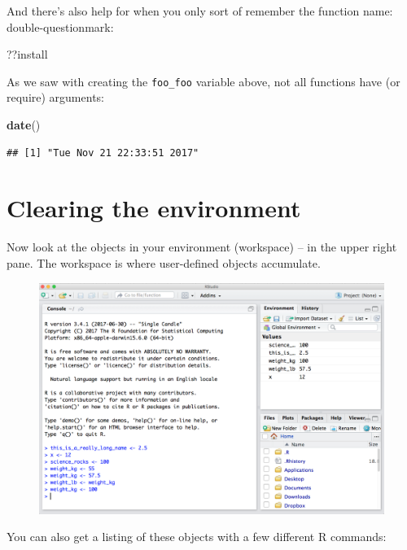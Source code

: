 \documentclass[]{book}
\newenvironment{Shaded}{\begin{snugshade}}{\end{snugshade}}
\newcommand{\KeywordTok}[1]{\textcolor[rgb]{0.13,0.29,0.53}{\textbf{#1}}}
\newcommand{\NormalTok}[1]{#1}
\theoremstyle{definition}
\theoremstyle{definition}
\theoremstyle{definition}
\theoremstyle{remark}
\begin{document}
And there's also help for when you only sort of remember the function
name: double-questionmark:

\begin{Shaded}
\begin{Highlighting}[]
\NormalTok{??install }
\end{Highlighting}
\end{Shaded}

As we saw with creating the \texttt{foo\_foo} variable above, not all
functions have (or require) arguments:

\begin{Shaded}
\begin{Highlighting}[]
\KeywordTok{date}\NormalTok{()}
\end{Highlighting}
\end{Shaded}

\begin{verbatim}
## [1] "Tue Nov 21 22:33:51 2017"
\end{verbatim}

\section{Clearing the environment}\label{clearing-the-environment}

Now look at the objects in your environment (workspace) -- in the upper
right pane. The workspace is where user-defined objects accumulate.

\begin{figure}
\centering
\includegraphics{img/RStudio_IDE_env.png}
\caption{}
\end{figure}

You can also get a listing of these objects with a few different R
commands:
\end{document}
